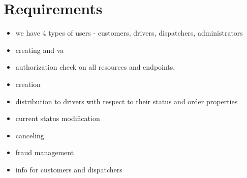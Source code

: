 \chapter{Requirements}
	

		\begin{itemize}
			\item we have 4 types of users - customers, drivers, dispatchers, administrators
			\item creating and va
			\item authorization check on all resources and endpoints,
		\end{itemize}
		\begin{itemize} 
			\item creation
			\item distribution to drivers with respect to their status and order properties
			\item current status modification
			\item canceling
			\item fraud management
			\item info for customers and dispatchers
		\end{itemize}